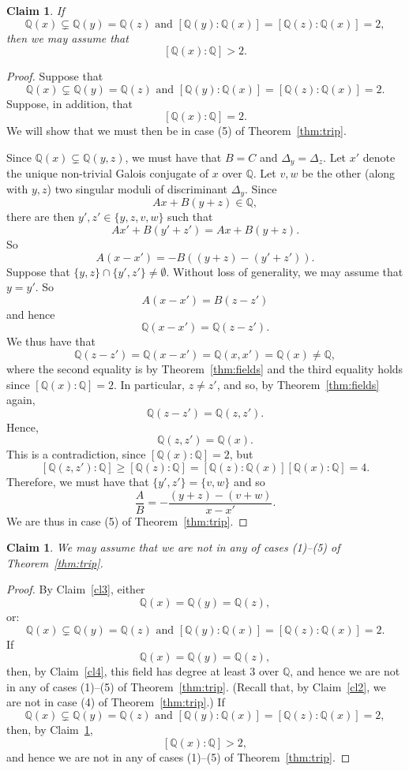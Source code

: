 \documentclass[11pt,a4paper, british]{amsart}
\newtheorem{claim}[thm]{Claim}
\theoremstyle{definition}
\theoremstyle{remark}
\numberwithin{equation}{section}
\newcommand{\Q}{\mathbb{Q}} %
\begin{document}
\begin{claim}\label{cl5}
	If
	\[ \Q(x) \subsetneq \Q(y) = \Q(z) \mbox{ and } [\Q(y) : \Q(x)] = [\Q(z) : \Q(x)] = 2,\]
then we may assume that
	\[ [\Q(x) : \Q] > 2.\]
\end{claim}

\begin{proof}
Suppose that
\[ \Q(x) \subsetneq \Q(y) = \Q(z) \mbox{ and } [\Q(y) : \Q(x)] = [\Q(z) : \Q(x)] = 2.\]
Suppose, in addition, that
\[ [\Q(x) : \Q] = 2.\]
We will show that we must then be in case (5) of Theorem~\ref{thm:trip}. 

Since $\Q(x) \subsetneq \Q(y, z)$, we must have that $B=C$ and $\Delta_y = \Delta_z$. Let $x'$ denote the unique non-trivial Galois conjugate of $x$ over $\Q$. Let $v, w$ be the other (along with $y, z$) two singular moduli of discriminant $\Delta_y$. Since
\[ Ax + B(y + z) \in \Q,\]
there are then $y', z' \in \{y, z, v, w\}$ such that
\[ Ax' + B(y'+z') = Ax + B(y + z).\]
So
\[ A(x-x') = -B((y+z) - (y'+z')).\]
Suppose that $\{y, z\} \cap \{y', z'\} \neq \emptyset$. Without loss of generality, we may assume that $y = y'$. So
\[ A(x-x') = B(z-z')\]
and hence
\[ \Q(x-x') = \Q(z-z').\]
We thus have that
\[ \Q(z - z') = \Q(x - x') = \Q(x, x') = \Q(x) \neq \Q,\]
where the second equality is by Theorem~\ref{thm:fields} and the third equality holds since $[\Q(x) : \Q] = 2$.
In particular, $z \neq z'$, and so, by Theorem~\ref{thm:fields} again,
\[    \Q(z - z') = \Q(z, z').\]
Hence,
\[\Q(z, z') = \Q(x).\]
This is a contradiction, since $[\Q(x) : \Q] = 2$, but
\[ [\Q(z, z') : \Q] \geq [\Q(z) : \Q] = [\Q(z) : \Q(x)] [\Q(x) : \Q] = 4.\]
Therefore, we must have that $\{y', z'\} = \{v, w\}$ and so
\[ \frac{A}{B} = - \frac{(y+z) - (v+w)}{x - x'}.\]
We are thus in case (5) of Theorem~\ref{thm:trip}. 
\end{proof}

\begin{claim}\label{cl6}
	We may assume that we are not in any of cases (1)--(5) of Theorem~\ref{thm:trip}.
\end{claim}

\begin{proof}
	By Claim~\ref{cl3}, either
		\[ \Q(x) = \Q(y) = \Q(z),\]
	or:
	\[ \Q(x) \subsetneq \Q(y) = \Q(z) \mbox{ and } [\Q(y) : \Q(x)] = [\Q(z) : \Q(x)] = 2.\]
	If 
	\[ \Q(x) = \Q(y) = \Q(z),\]
	then, by Claim~\ref{cl4}, this field has degree at least $3$ over $\Q$, and hence we are not in any of cases (1)--(5) of Theorem~\ref{thm:trip}. (Recall that, by Claim~\ref{cl2}, we are not in case (4) of Theorem~\ref{thm:trip}.)
	If 
	\[ \Q(x) \subsetneq \Q(y) = \Q(z) \mbox{ and } [\Q(y) : \Q(x)] = [\Q(z) : \Q(x)] = 2,\]
	then, by Claim~\ref{cl5},
	\[[\Q(x) : \Q] > 2,\]
	and hence we are not in any of cases (1)--(5) of Theorem~\ref{thm:trip}.
\end{proof}
\end{document}
